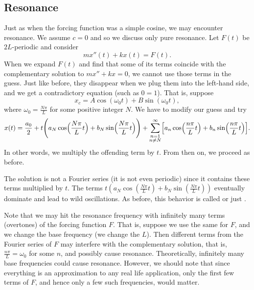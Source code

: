\subsection{Resonance}

Just as when the forcing function was a simple cosine, we may encounter
resonance.  We assume $c=0$ and so we discuss only pure resonance.
Let $F(t)$ be $2L$-periodic and consider
\begin{equation*}
m x''(t) + k x (t) = F(t) .
\end{equation*}
When we expand $F(t)$ and find that some of its terms coincide with the
complementary solution to $mx''+kx=0$, we cannot use those terms in the
guess.  Just like before, they disappear when we plug them into the left-hand
side, and we get a contradictory equation (such as $0=1$).   That is,
suppose
\begin{equation*}
x_c = A \cos (\omega_0 t) + B \sin (\omega_0 t), 
\end{equation*}
where $\omega_0 = \frac{N \pi}{L}$ for some positive integer $N$.
We have
to modify our guess and try
\begin{equation*}
x(t) = \frac{a_0}{2} +
t \Biggl(
a_N \cos \Bigl( \frac{N \pi}{L} t \Bigr) +
b_N \sin \Bigl( \frac{N \pi}{L} t \Bigr)
\Biggr) +
\sum_{\substack{n=1\\n \neq N}}^\infty
\Bigl[
a_n \cos \Bigl( \frac{n \pi}{L} t \Bigr) +
b_n \sin \Bigl( \frac{n \pi}{L} t \Bigr)
\Bigr].
\end{equation*}
In other words, we multiply the offending term by $t$.  From then on, we
proceed as before.

The solution is not a Fourier series (it is not even
periodic) since it contains these terms multiplied by $t$.
The terms
$t \left( a_N \cos \left( \frac{N \pi}{L} t \right) +
b_N \sin \left( \frac{N \pi}{L} t \right) \right)$ eventually dominate and lead to
wild oscillations.  As before, this behavior is called \emph{} or just \emph{}.

Note that we may hit the resonance frequency with infinitely
many terms (overtones) of the forcing function $F$.
That is, suppose we use the same  for $F$, and we change the
base frequency (we change the $L$).
Then different
terms from the Fourier series of $F$ may interfere with the complementary
solution, that is, $\frac{n \pi}{L} = \omega_0$ for some $n$, and possibly
cause resonance.
Theoretically, infinitely many base frequencies
could cause resonance.
However, we should note that since everything is an approximation to
any real life application,
only the first
few terms of $F$, and hence only a few such frequencies,
would matter.

